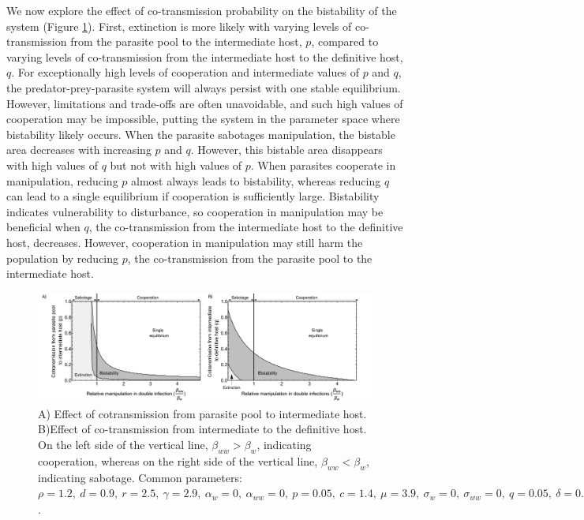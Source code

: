 \documentclass[a4paper]{scrartcl}
\begin{document}
We now explore the effect of co-transmission probability on the bistability of the system (Figure \ref{fig:contransmission}). 
First, extinction is more likely with varying levels of co-transmission from the parasite pool to the intermediate host, $p$, compared to varying levels of co-transmission from the intermediate host to the definitive host, $q$. 
For exceptionally high levels of cooperation and intermediate values of $p$ and $q$, the predator-prey-parasite system will always persist with one stable equilibrium.
However, limitations and trade-offs are often unavoidable, and such high values of cooperation may be impossible, putting the system in the parameter space where bistability likely occurs.
When the parasite sabotages manipulation, the bistable area decreases with increasing $p$ and $q$. 
However, this bistable area disappears with high values of $q$ but not with high values of $p$. 
When parasites cooperate in manipulation, reducing $p$ almost always leads to bistability, whereas reducing $q$ can lead to a single equilibrium if cooperation is sufficiently large.  
Bistability indicates vulnerability to disturbance, so cooperation in manipulation may be beneficial when $q$, the co-transmission from the intermediate host to the definitive host, decreases. 
However, cooperation in manipulation may still harm the population by reducing $p$, the co-transmission from the parasite pool to the intermediate host.

\begin{figure}[!ht]
	\captionsetup{format=plain}
	\centering
	\includegraphics[width=\textwidth]{Figures/coinfect_transmission.pdf}
	\caption{A) Effect of cotransmission from parasite pool to intermediate host. B)Effect of co-transmission from intermediate to the definitive host. On the left side of the vertical line, $\beta_{ww} > \beta_{w}$, indicating cooperation, whereas on the right side of the vertical line, $\beta_{ww} < \beta_{w}$, indicating sabotage. Common parameters:  $\rho = 1.2, \ d = 0.9, \ r = 2.5, \ \gamma = 2.9, \ \alpha_w = 0, \ \alpha_{ww} = 0, \ p = 0.05, \ c = 1.4, \ \mu = 3.9, \ \sigma_w = 0, \ \sigma_{ww} = 0, \ q = 0.05, \ \delta = 0.9, \ k = 0.26, \ \epsilon = 4.5, \ \beta_w = 1.45, \ f_w = 38, \ h = 0.6$.}
	\label{fig:contransmission}
\end{figure}
\end{document}
